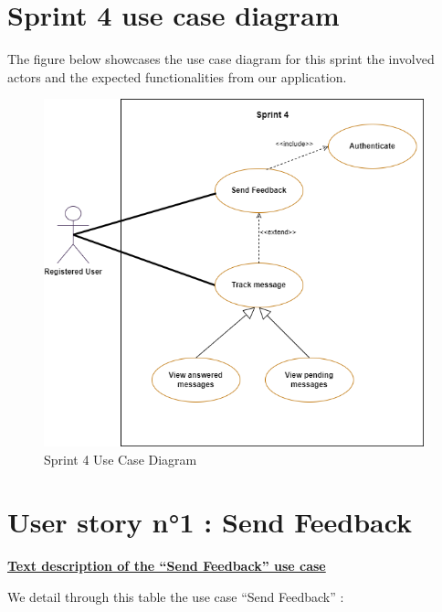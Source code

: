 \section{Sprint 4 use case diagram}

The figure below showcases the use case diagram for this sprint the involved actors and the expected functionalities  from our application.

\begin{figure}[H]
    \includegraphics[width=0.98\textwidth]{images/sprint4/Sprint4UC.png}
     \caption{Sprint 4 Use Case Diagram}
    \label{fig:enter-label}
    
\end{figure}

\newpage
\section{User story n°1 : Send Feedback}
\textbf{\underline{Text description of the “Send Feedback” use case}}

\vspace{0.25cm}
We detail through this table the use case “Send Feedback” :

